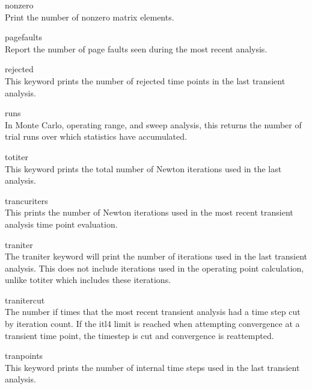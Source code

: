 \begin{description}
\item{\vt nonzero}\\
Print the number of nonzero matrix elements.

\item{\vt pagefaults}\\
Report the number of page faults seen during the most recent analysis.

\item{\vt rejected}\\
This keyword prints the number of rejected time points in the last
transient analysis.

\item{runs}\\
In Monte Carlo, operating range, and sweep analysis, this returns    
the number of trial runs over which statistics have accumulated.

\item{\vt totiter}\\
This keyword prints the total number of Newton iterations used in
the last analysis.

\item{\vt trancuriters}\\
This prints the number of Newton iterations used in the most recent
transient analysis time point evaluation.

\item{\vt traniter}\\
The {\vt traniter} keyword will print the number of iterations used in
the last transient analysis.  This does not include iterations used in
the operating point calculation, unlike {\vt totiter} which includes
these iterations.

\item{\vt tranitercut}\\
The number if times that the most recent transient analysis had a time
step cut by iteration count.  If the {\et itl4} limit is reached when
attempting convergence at a transient time point, the timestep is cut
and convergence is reattempted.

\item{\vt tranpoints}\\
This keyword prints the number of internal time steps used in the
last transient analysis.


\end{description}
